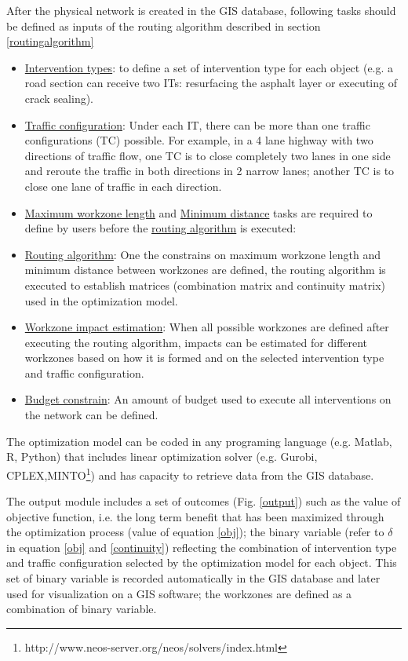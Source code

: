 \documentclass[a4paper,3p,times,authoryear]{elsarticle}
\begin{document}
After the physical network is created in the GIS database, following tasks should be defined as inputs of the routing algorithm described in section \ref{routingalgorithm} 

\begin{itemize}
 \item \underline{Intervention types}: to define a set of intervention type for each object (e.g. a road section can receive two ITs: resurfacing the asphalt layer or executing of crack sealing). 
 \item \underline{Traffic configuration}: Under each IT, there can be more than one traffic configurations (TC) possible. For example, in a 4 lane highway with two directions of traffic flow, one TC is to close completely two lanes in one side and reroute the traffic in both directions in 2 narrow lanes; another TC is to close one lane of traffic in each direction.
 \item \underline{Maximum workzone length} and \underline{Minimum distance} tasks are required to define by users before the \underline{routing algorithm} is executed: 
 \item \underline{Routing algorithm}: One the constrains on maximum workzone length and minimum distance between workzones are defined, the routing algorithm is executed to establish matrices (combination matrix and continuity matrix) used in the optimization model.
 \item \underline{Workzone impact estimation}: When all possible workzones are defined after executing the routing algorithm, impacts can be estimated for different workzones based on how it is formed and on the selected intervention type and traffic configuration.
 \item \underline{Budget constrain}: An amount of budget used to execute all interventions on the network can be defined. 
\end{itemize}

The optimization model can be coded in any programing language (e.g. Matlab, R, Python) that includes linear optimization solver (e.g. Gurobi, CPLEX,MINTO\footnote{http://www.neos-server.org/neos/solvers/index.html}) and has capacity to retrieve data from the GIS database.

The output module includes a set of outcomes (Fig. \ref{output}) such as the value of objective function, i.e. the long term benefit that has been maximized through the optimization process (value of equation \eqref{obj}); the binary variable (refer to $\delta$ in equation \eqref{obj} and \eqref{continuity}) reflecting the combination of intervention type and traffic configuration selected by the optimization model for each object. This set of binary variable is recorded automatically in the GIS database and later used for visualization on a GIS software; the workzones are defined as a combination of binary variable. 
\end{document}
